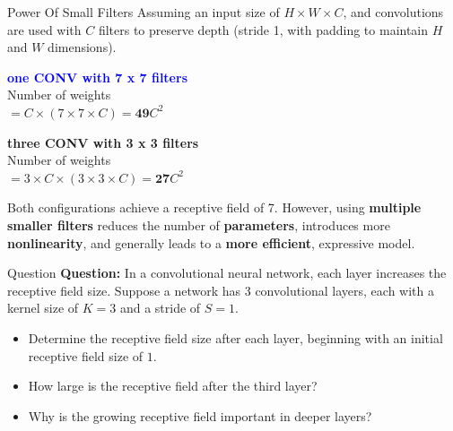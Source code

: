 \documentclass[default, aspectratio=169]{beamer}
\begin{document}
	\begin{frame}{Power Of Small Filters}
		Assuming an input size of  $H \times W \times C$, and convolutions are used with $C$ filters to preserve depth (stride 1, with padding to maintain $H$ and $W$ dimensions).
		
		\bigskip
		\begin{minipage}{0.45\textwidth}
			\textcolor{blue}{\textbf{one CONV with 7 x 7 filters}} \\
			Number of weights \\
			$= C \times (7 \times 7 \times C) = \textbf{49} C^2$
		\end{minipage}
		\hfill
		\begin{minipage}{0.45\textwidth}
			\textbf{three CONV with 3 x 3 filters} \\
			Number of weights \\
			$= 3 \times C \times (3 \times 3 \times C) = \textbf{27} C^2$
		\end{minipage}
		\bigskip
		\begin{flushleft}
			Both configurations achieve a receptive field of 7. However, using \textbf{multiple smaller filters} reduces the number of \textbf{parameters}, introduces more \textbf{nonlinearity}, and generally leads to a \textbf{more efficient}, expressive model.
		\end{flushleft}
	\end{frame}	
	\begin{frame}{Question}
		\textbf{Question:} In a convolutional neural network, each layer increases the receptive field size. 
		Suppose a network has 3 convolutional layers, each with a kernel size of \( K = 3 \) and a stride of \( S = 1 \).
		\begin{itemize}
			\item Determine the receptive field size after each layer, beginning with an initial receptive field size of \( 1 \).
			\item How large is the receptive field after the third layer?
			\item Why is the growing receptive field important in deeper layers?
		\end{itemize}
	\end{frame}
	
\end{document}
